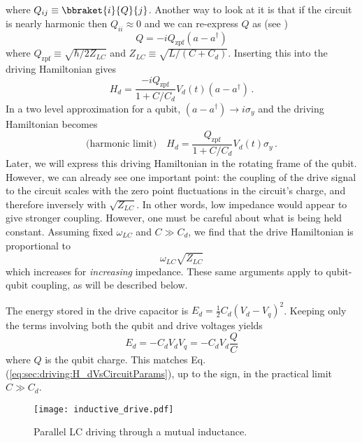 where $Q_{ij} \equiv \bbraket{i}{Q}{j}$.
Another way to look at it is that if the circuit is nearly harmonic then $Q_{ii}\approx 0$ and we can re-express $Q$ as (see \citeinternaltype {})
\begin{equation}
Q = -iQ_{\textrm{zpf}}(a-a^{\dagger})
\end{equation}
where $Q_{\textrm{zpf}}\equiv \sqrt{\hbar/2Z_{LC}}$ and $Z_{LC} \equiv \sqrt{L/(C+C_d)}$.
Inserting this into the driving Hamiltonian gives
\begin{equation}
H_d = \frac{-iQ_{\textrm{zpf}}}{1+C/C_d}V_d(t) (a-a^{\dagger}) \, .
\end{equation}
In a two level approximation for a qubit, $(a-a^{\dagger}) \rightarrow i \sigma_y$ and the driving Hamiltonian becomes \begin{equation}
\text{(harmonic limit)} \quad H_d = \frac{Q_{\textrm{zpf}}}{1+C/C_d}V_d(t) \sigma_y \, . \label{eq:drivingHamiltonianLabFrame}
\end{equation}
Later, we will express this driving Hamiltonian in the rotating frame of the qubit.
However, we can already see one important point: the coupling of the drive signal to the circuit scales with the zero point fluctuations in the circuit's charge, and therefore inversely with $\sqrt{Z_{LC}}$.
In other words, low impedance would appear to give stronger coupling.
However, one must be careful about what is being held constant.
Assuming fixed $\omega_{LC}$ and $C \gg C_d$, we find that the drive Hamiltonian is proportional to
\begin{equation}
\omega_{LC} \sqrt{Z_{LC}}
\end{equation}
which increases for \emph{increasing} impedance.
These same arguments apply to qubit-qubit coupling, as will be described below.


The energy stored in the drive capacitor is $E_d = \frac{1}{2}C_d\left( V_d - V_q \right)^2$.
Keeping only the terms involving both the qubit and drive voltages yields \begin{equation}
E_d = - C_d V_d V_q = - C_d V_d \frac{Q}{C} \end{equation}
where $Q$ is the qubit charge.
This matches Eq.\,(\ref{eq:sec:driving:H_dVsCircuitParams}), up to the sign, in the practical limit $C \gg C_d$.



\begin{figure}
\begin{centering}
\texttt{[image: inductive\_drive.pdf]}
\par\end{centering}
  \caption{Parallel LC driving through a mutual inductance.}
\label{fig:qubits.inductive_drive}
\end{figure}

